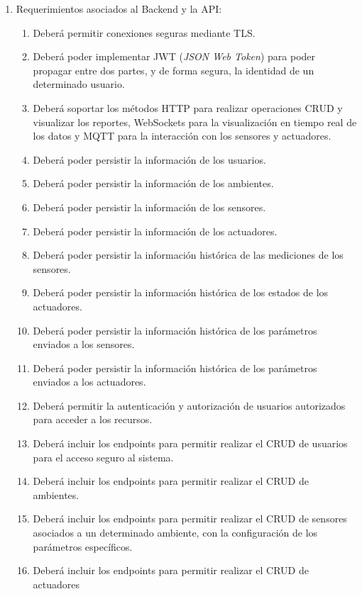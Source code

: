 \begin{enumerate}
	\item Requerimientos asociados al Backend y la API:
	      \begin{enumerate}
		      \item Deberá permitir conexiones seguras mediante TLS.
		      \item Deberá poder implementar JWT (\textit{JSON Web Token}) para poder propagar
		            entre dos partes, y de forma segura, la identidad de un determinado usuario.
		      \item Deberá soportar los métodos HTTP para realizar operaciones CRUD y visualizar
		            los reportes, WebSockets para la visualización en tiempo real de los datos y
		            MQTT para la interacción con los sensores y actuadores.
		      \item Deberá poder persistir la información de los usuarios.
		      \item Deberá poder persistir la información de los ambientes.
		      \item Deberá poder persistir la información de los sensores.
		      \item Deberá poder persistir la información de los actuadores.
		      \item Deberá poder persistir la información histórica de las mediciones de los
		            sensores.
		      \item Deberá poder persistir la información histórica de los estados de los
		            actuadores.
		      \item Deberá poder persistir la información histórica de los parámetros enviados a
		            los sensores.
		      \item Deberá poder persistir la información histórica de los parámetros enviados a
		            los actuadores.
		      \item Deberá permitir la autenticación y autorización de usuarios autorizados para
		            acceder a los recursos.
		      \item Deberá incluir los endpoints para permitir realizar el CRUD de usuarios para el
		            acceso seguro al sistema.
		      \item Deberá incluir los endpoints para permitir realizar el CRUD de ambientes.
		      \item Deberá incluir los endpoints para permitir realizar el CRUD de sensores
		            asociados a un determinado ambiente, con la configuración de los parámetros
		            específicos.
		      \item Deberá incluir los endpoints para permitir realizar el CRUD de actuadores

\end{enumerate}
\end{enumerate}
